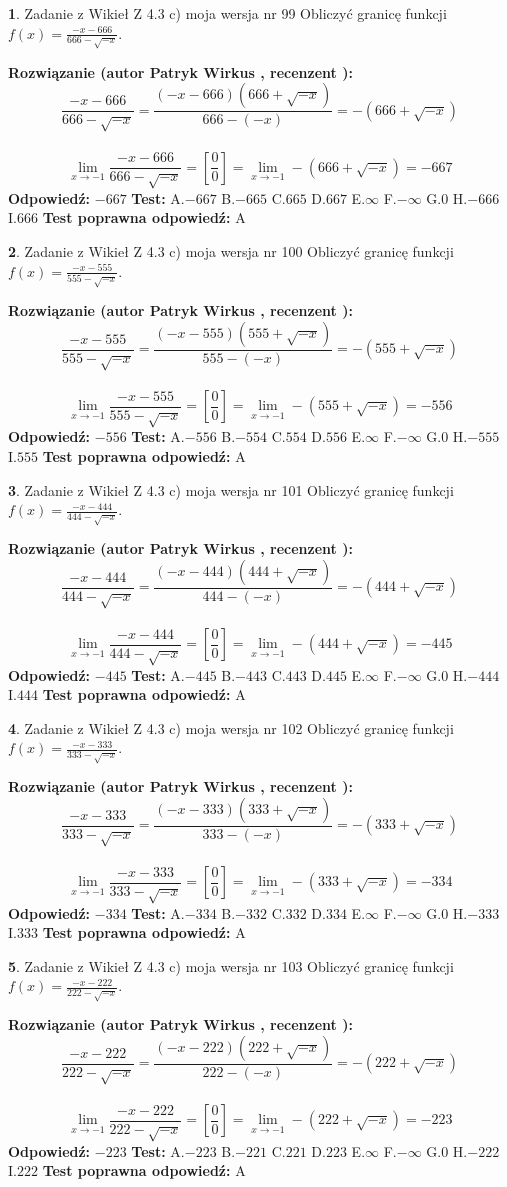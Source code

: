 \documentclass[12pt, a4paper]{article}
\theoremstyle{definition} %
\newtheorem{zad}{}
\newcommand{\zadStart}[1]{\begin{zad}#1\newline}
\newcommand{\zadStop}{\end{zad}}
\newcommand{\rozwStart}[2]{\noindent \textbf{Rozwiązanie (autor #1 , recenzent #2): }\newline}
\newcommand{\rozwStop}{\newline}
\newcommand{\odpStart}{\noindent \textbf{Odpowiedź:}\newline}
\newcommand{\odpStop}{\newline}
\newcommand{\testStart}{\noindent \textbf{Test:}\newline}
\newcommand{\testStop}{\newline}
\newcommand{\kluczStart}{\noindent \textbf{Test poprawna odpowiedź:}\newline}
\newcommand{\kluczStop}{\newline}
\begin{document}
\zadStart{Zadanie z Wikieł Z 4.3 c) moja wersja nr 99}
Obliczyć granicę funkcji $f(x)=\frac{-x-666}{666-\sqrt{-x}}$.
\zadStop
\rozwStart{Patryk Wirkus}{}
$$\frac{-x-666}{666-\sqrt{-x}}=\frac{(-x-666)(666+\sqrt{-x})}{666-(-x)}=-(666+\sqrt{-x})$$
\\
$$\lim\limits_{x\to-1}\frac{-x-666}{666-\sqrt{-x}}=[\frac{0}{0}]=\lim\limits_{x\to-1}-(666+\sqrt{-x}) =-667$$
\rozwStop
\odpStart
$-667$
\odpStop
\testStart
A.$-667$
B.$-665$
C.$665$
D.$667$
E.$\infty$
F.$-\infty$
G.$0$
H.$-666$
I.$666$
\testStop
\kluczStart
A
\kluczStop



\zadStart{Zadanie z Wikieł Z 4.3 c) moja wersja nr 100}
Obliczyć granicę funkcji $f(x)=\frac{-x-555}{555-\sqrt{-x}}$.
\zadStop
\rozwStart{Patryk Wirkus}{}
$$\frac{-x-555}{555-\sqrt{-x}}=\frac{(-x-555)(555+\sqrt{-x})}{555-(-x)}=-(555+\sqrt{-x})$$
\\
$$\lim\limits_{x\to-1}\frac{-x-555}{555-\sqrt{-x}}=[\frac{0}{0}]=\lim\limits_{x\to-1}-(555+\sqrt{-x}) =-556$$
\rozwStop
\odpStart
$-556$
\odpStop
\testStart
A.$-556$
B.$-554$
C.$554$
D.$556$
E.$\infty$
F.$-\infty$
G.$0$
H.$-555$
I.$555$
\testStop
\kluczStart
A
\kluczStop



\zadStart{Zadanie z Wikieł Z 4.3 c) moja wersja nr 101}
Obliczyć granicę funkcji $f(x)=\frac{-x-444}{444-\sqrt{-x}}$.
\zadStop
\rozwStart{Patryk Wirkus}{}
$$\frac{-x-444}{444-\sqrt{-x}}=\frac{(-x-444)(444+\sqrt{-x})}{444-(-x)}=-(444+\sqrt{-x})$$
\\
$$\lim\limits_{x\to-1}\frac{-x-444}{444-\sqrt{-x}}=[\frac{0}{0}]=\lim\limits_{x\to-1}-(444+\sqrt{-x}) =-445$$
\rozwStop
\odpStart
$-445$
\odpStop
\testStart
A.$-445$
B.$-443$
C.$443$
D.$445$
E.$\infty$
F.$-\infty$
G.$0$
H.$-444$
I.$444$
\testStop
\kluczStart
A
\kluczStop



\zadStart{Zadanie z Wikieł Z 4.3 c) moja wersja nr 102}
Obliczyć granicę funkcji $f(x)=\frac{-x-333}{333-\sqrt{-x}}$.
\zadStop
\rozwStart{Patryk Wirkus}{}
$$\frac{-x-333}{333-\sqrt{-x}}=\frac{(-x-333)(333+\sqrt{-x})}{333-(-x)}=-(333+\sqrt{-x})$$
\\
$$\lim\limits_{x\to-1}\frac{-x-333}{333-\sqrt{-x}}=[\frac{0}{0}]=\lim\limits_{x\to-1}-(333+\sqrt{-x}) =-334$$
\rozwStop
\odpStart
$-334$
\odpStop
\testStart
A.$-334$
B.$-332$
C.$332$
D.$334$
E.$\infty$
F.$-\infty$
G.$0$
H.$-333$
I.$333$
\testStop
\kluczStart
A
\kluczStop



\zadStart{Zadanie z Wikieł Z 4.3 c) moja wersja nr 103}
Obliczyć granicę funkcji $f(x)=\frac{-x-222}{222-\sqrt{-x}}$.
\zadStop
\rozwStart{Patryk Wirkus}{}
$$\frac{-x-222}{222-\sqrt{-x}}=\frac{(-x-222)(222+\sqrt{-x})}{222-(-x)}=-(222+\sqrt{-x})$$
\\
$$\lim\limits_{x\to-1}\frac{-x-222}{222-\sqrt{-x}}=[\frac{0}{0}]=\lim\limits_{x\to-1}-(222+\sqrt{-x}) =-223$$
\rozwStop
\odpStart
$-223$
\odpStop
\testStart
A.$-223$
B.$-221$
C.$221$
D.$223$
E.$\infty$
F.$-\infty$
G.$0$
H.$-222$
I.$222$
\testStop
\kluczStart
A
\kluczStop
\end{document}
